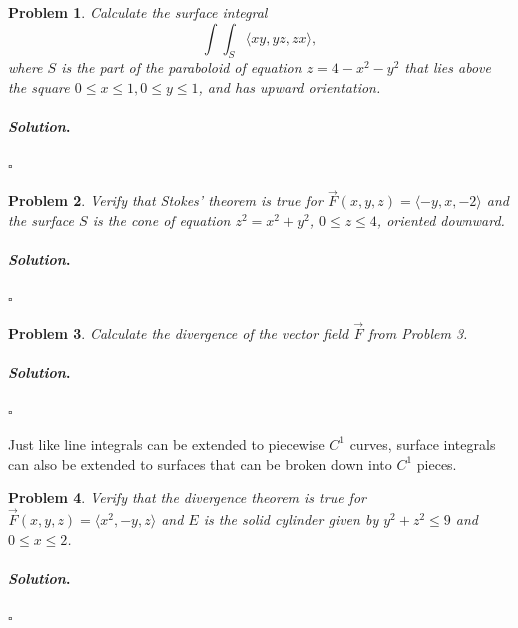 \documentclass[reqno]{amsart}
\theoremstyle{plain}
\newtheorem{problem}{Problem}
\theoremstyle{definition}
\newenvironment{solution}{\paragraph{\emph{Solution}.}}{\hfill$\square$}
\begin{document}
\begin{problem}
Calculate the surface integral
$$\int \int_{S} \langle xy,yz,zx\rangle, $$
where $S$ is the part of the paraboloid of equation $z = 4 - x^{2} - y^{2}$ that lies above the square $0 \le x \le 1, 0 \le y \le 1$, and has upward orientation.
\end{problem}
\begin{solution}

\end{solution}

\begin{problem}
Verify that Stokes' theorem is true for $\vec{F}(x,y,z) = \langle -y,x,-2\rangle$ and the surface $S$ is the cone of equation $z^{2} = x^{2}+y^{2}$, $0 \le z \le 4$, oriented downward.
\end{problem}
\begin{solution}

\end{solution}

\begin{problem}
Calculate the divergence of the vector field $\vec{F}$ from Problem 3.
\end{problem}
\begin{solution}

\end{solution}


Just like line integrals can be extended to piecewise $C^{1}$ curves, surface integrals can also be extended to surfaces that can be broken down into $C^{1}$ pieces.
\begin{problem}
Verify that the divergence theorem is true for $\vec{F}(x,y,z) = \langle x^{2},-y,z \rangle$ and $E$ is the solid cylinder given by $y^{2} + z^{2} \le 9$ and $0 \le x \le 2$.
\end{problem}
\begin{solution}

\end{solution}
\end{document}
